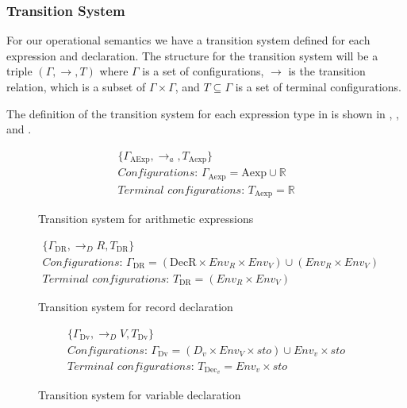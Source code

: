 \subsubsection*{Transition System}

For our operational semantics we have a transition system defined for each expression and declaration. 
The structure for the transition system will be a triple $(\Gamma,\rightarrow,T)$ where $\Gamma$ is a set of configurations, $\rightarrow$ is the transition relation, which is a subset of $\Gamma\times\Gamma$, and $T\subseteq \Gamma$ is a set of terminal configurations. \cite{huttelTransitionsTreesIntroduction2010}

The definition of the transition system for each expression type in \dazel{} is shown in , ,  and . 
\begin{figure}[htbp]
	\begin{gather*} 
		\{ \Gamma_\text{AExp}, \rightarrow_a, T_\text{Aexp} \} \\ 
		\textit{Configurations: } \Gamma_\text{Aexp} = \text{Aexp} \cup \mathbb{R} \\ 
		\textit{Terminal configurations: } T_\text{Aexp} = \mathbb{R}
	\end{gather*}
	\caption{Transition system for arithmetic expressions}
	\label{fig:TSAexp}
\end{figure}

\begin{figure}[htbp]
	\begin{gather*} 
		\{ \Gamma_\text{DR}, \rightarrow_DR, T_\text{DR} \} \\ 
		\textit{Configurations: } \Gamma_\text{DR} = (\text{DecR} \times Env_R \times Env_V) \cup (Env_R \times Env_V) \\ 
		\textit{Terminal configurations: } T_\text{DR} = (Env_R \times Env_V)
	\end{gather*}
	\caption{Transition system for record declaration}
	\label{fig:TSBexp}
\end{figure}

\begin{figure}[htbp]
	\begin{gather*} 
		\{ \Gamma_\text{Dv}, \rightarrow_DV, T_\text{Dv} \} \\ 
		\textit{Configurations: } \Gamma_\text{Dv} = (D_v \times Env_V \times sto) \cup Env_v \times sto \\ 
		\textit{Terminal configurations: } T_{\text{Dec}_v} = Env_v \times sto
	\end{gather*} 
	\caption{Transition system for variable declaration}
	\label{fig:TSDecv}
\end{figure}

